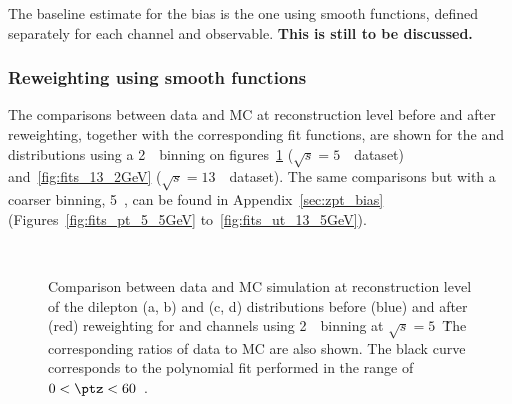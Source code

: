The baseline estimate for the bias is the one using smooth functions, defined separately for each channel and observable. \textbf{This is still to be discussed.}

\subsubsection{Reweighting using smooth functions} The comparisons between data and MC at reconstruction level before and after reweighting, together with the corresponding fit functions, are shown for the \ptdilep and \ut distributions using a 2~\GeV\ binning on figures~\ref{fig:fits_5_2GeV} ($\sqrt{s} = 5$~\TeV\ dataset) and~\ref{fig:fits_13_2GeV} ($\sqrt{s} = 13$~\TeV\ dataset). The same comparisons but with a coarser binning, 5~\GeV, can be found in Appendix~\ref{sec:zpt_bias} (Figures~\ref{fig:fits_pt_5_5GeV} to~\ref{fig:fits_ut_13_5GeV}).

\begin{figure}[h]
\centering
{}
\\
\caption{Comparison between data and MC simulation at reconstruction level of the dilepton \pt (a, b) and \ut (c, d) distributions before (blue) and after (red) reweighting for \Zee and \Zmm channels using  2~\GeV\ binning at $\sqrt{s} = 5$~\TeV\. The corresponding ratios of data to MC are also shown. The black curve corresponds to the polynomial fit performed in the range of $0<\ptz<60$~\GeV. }
\label{fig:fits_5_2GeV}
\end{figure}

